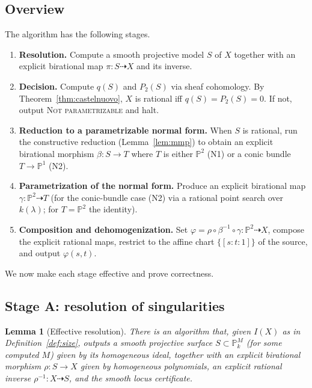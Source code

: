 \documentclass{amsart}
\theoremstyle{plain}
\newtheorem{lemma}{Lemma}
\theoremstyle{definition}
\newcommand{\PP}{\mathbb{P}}
\begin{document}
\subsection{Overview}
The algorithm has the following stages.
\begin{enumerate}
\item[(A)] \textbf{Resolution.}  Compute a smooth projective model $S$ of $X$
together with an explicit birational map $\pi\colon S\dashrightarrow X$ and its
inverse.
\item[(B)] \textbf{Decision.}  Compute $q(S)$ and $P_2(S)$ via sheaf cohomology.
By Theorem~\ref{thm:castelnuovo}, $X$ is rational iff $q(S)=P_2(S)=0$.  If not,
output \textsc{Not parametrizable} and halt.
\item[(C)] \textbf{Reduction to a parametrizable normal form.}  When $S$ is
rational, run the constructive reduction (Lemma~\ref{lem:mmp}) to obtain an
explicit birational morphism $\beta\colon S\to T$ where $T$ is either $\PP^2$
\textup{(N1)} or a conic bundle $T\to\PP^1$ \textup{(N2)}.
\item[(D)] \textbf{Parametrization of the normal form.}  Produce an explicit
birational map $\gamma\colon\PP^2\dashrightarrow T$ (for the conic-bundle case
(N2) via a rational point search over $k(\lambda)$; for $T=\PP^2$ the identity).
\item[(E)] \textbf{Composition and dehomogenization.}  Set
$\varphi=\rho\circ\beta^{-1}\circ\gamma\colon\PP^2\dashrightarrow X$, compose the
explicit rational maps, restrict to the affine chart $\{[s:t:1]\}$ of the source,
and output $\varphi(s,t)$.
\end{enumerate}

We now make each stage effective and prove correctness.

\subsection{Stage A: resolution of singularities}

\begin{lemma}[Effective resolution]\label{lem:resolution}
There is an algorithm that, given $I(X)$ as in Definition~\ref{def:size},
outputs a smooth projective surface $S\subset\PP^{M}_k$ (for some computed $M$)
given by its homogeneous ideal, together with an explicit birational morphism
$\rho\colon S\to X$ given by homogeneous polynomials, an explicit rational
inverse $\rho^{-1}\colon X\dashrightarrow S$, and the smooth locus certificate.
\end{lemma}
\end{document}
